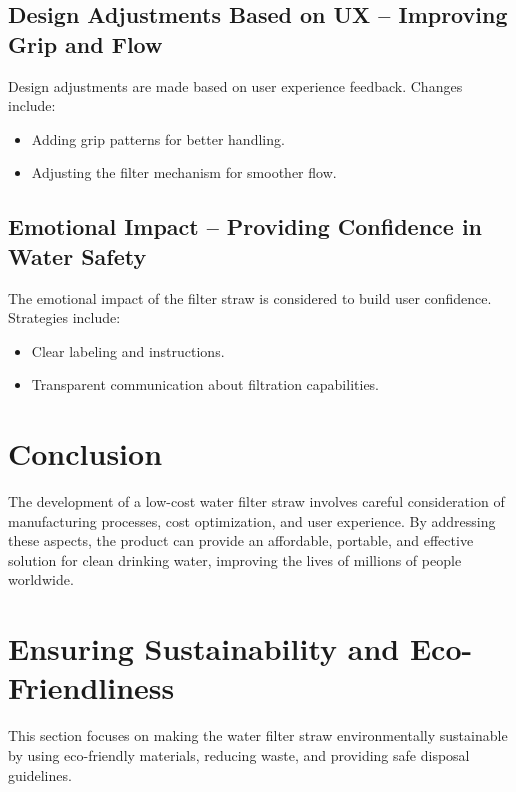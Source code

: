 \documentclass{article}
\begin{document}
\vspace{0.5cm}

\subsection{Design Adjustments Based on UX – Improving Grip and Flow}
Design adjustments are made based on user experience feedback. Changes include:
\begin{itemize}
    \item Adding grip patterns for better handling.
    \item Adjusting the filter mechanism for smoother flow.
\end{itemize}

\vspace{0.5cm}

\subsection{Emotional Impact – Providing Confidence in Water Safety}
The emotional impact of the filter straw is considered to build user confidence. Strategies include:
\begin{itemize}
    \item Clear labeling and instructions.
    \item Transparent communication about filtration capabilities.
\end{itemize}

\vspace{0.5cm}

\section*{Conclusion}
The development of a low-cost water filter straw involves careful consideration of manufacturing processes, cost optimization, and user experience. By addressing these aspects, the product can provide an affordable, portable, and effective solution for clean drinking water, improving the lives of millions of people worldwide.

\newpage








\section{Ensuring Sustainability and Eco-Friendliness}
This section focuses on making the water filter straw environmentally sustainable by using eco-friendly materials, reducing waste, and providing safe disposal guidelines.
\end{document}
